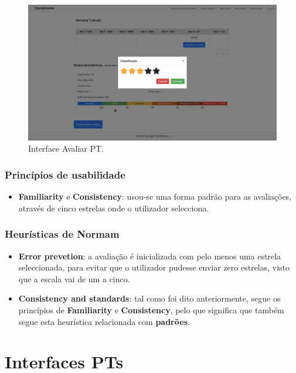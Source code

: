 \begin{figure}[H]
    \centering
    \includegraphics[scale=0.25]{images/interfaces/client_avaliar_pt.png}
    \caption{Interface Avaliar PT.}
    \label{fig:interfaceavaliarpt}
\end{figure}

\subsubsection{Princípios de usabilidade}
\begin{itemize}
    \item \textbf{Familiarity} e \textbf{Consistency}: usou-se uma forma padrão para as avaliações, através de cinco estrelas onde o utilizador selecciona.
\end{itemize}

\subsubsection{Heurísticas de Normam}
\begin{itemize}
    \item \textbf{Error prevetion}: a avaliação é inicializada com pelo menos uma estrela seleccionada, para evitar que o utilizador pudesse enviar zero estrelas, visto que a escala vai de um a cinco.
    \item \textbf{Consistency and standards}: tal como foi dito anteriormente, segue os princípios de \textbf{Familiarity} e \textbf{Consistency}, pelo que significa que também segue esta heurística relacionada com \textbf{padrões}.
\end{itemize}


\section{Interfaces PTs}
\label{sec:mockupspts}


